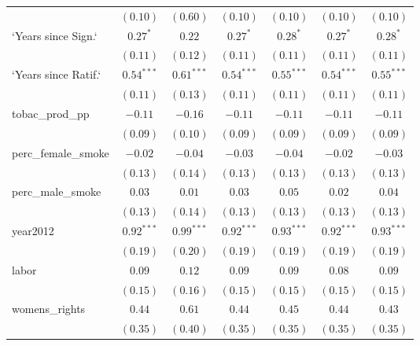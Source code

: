 \begin{table}[!h]
\begin{center}
\begin{tabular}{l c c c c c c }
                        & $(0.10)$     & $(0.60)$     & $(0.10)$     & $(0.10)$     & $(0.10)$     & $(0.10)$     \\
`Years since Sign.`     & $0.27^{*}$   & $0.22$       & $0.27^{*}$   & $0.28^{*}$   & $0.27^{*}$   & $0.28^{*}$   \\
                        & $(0.11)$     & $(0.12)$     & $(0.11)$     & $(0.11)$     & $(0.11)$     & $(0.11)$     \\
`Years since Ratif.`    & $0.54^{***}$ & $0.61^{***}$ & $0.54^{***}$ & $0.55^{***}$ & $0.54^{***}$ & $0.55^{***}$ \\
                        & $(0.11)$     & $(0.13)$     & $(0.11)$     & $(0.11)$     & $(0.11)$     & $(0.11)$     \\
tobac\_prod\_pp         & $-0.11$      & $-0.16$      & $-0.11$      & $-0.11$      & $-0.11$      & $-0.11$      \\
                        & $(0.09)$     & $(0.10)$     & $(0.09)$     & $(0.09)$     & $(0.09)$     & $(0.09)$     \\
perc\_female\_smoke     & $-0.02$      & $-0.04$      & $-0.03$      & $-0.04$      & $-0.02$      & $-0.03$      \\
                        & $(0.13)$     & $(0.14)$     & $(0.13)$     & $(0.13)$     & $(0.13)$     & $(0.13)$     \\
perc\_male\_smoke       & $0.03$       & $0.01$       & $0.03$       & $0.05$       & $0.02$       & $0.04$       \\
                        & $(0.13)$     & $(0.14)$     & $(0.13)$     & $(0.13)$     & $(0.13)$     & $(0.13)$     \\
year2012                & $0.92^{***}$ & $0.99^{***}$ & $0.92^{***}$ & $0.93^{***}$ & $0.92^{***}$ & $0.93^{***}$ \\
                        & $(0.19)$     & $(0.20)$     & $(0.19)$     & $(0.19)$     & $(0.19)$     & $(0.19)$     \\
labor                   & $0.09$       & $0.12$       & $0.09$       & $0.09$       & $0.08$       & $0.09$       \\
                        & $(0.15)$     & $(0.16)$     & $(0.15)$     & $(0.15)$     & $(0.15)$     & $(0.15)$     \\
womens\_rights          & $0.44$       & $0.61$       & $0.44$       & $0.45$       & $0.44$       & $0.43$       \\
                        & $(0.35)$     & $(0.40)$     & $(0.35)$     & $(0.35)$     & $(0.35)$     & $(0.35)$     \\

\end{tabular}
\end{center}
\end{table}
